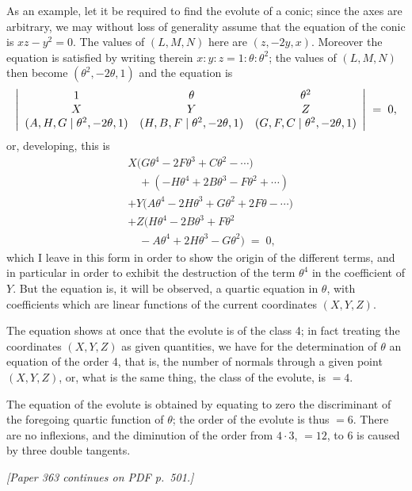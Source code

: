 \documentclass[11pt]{article}
\begin{document}
As an example, let it be required to find the evolute of a conic; since the axes are arbitrary, we may without loss of generality assume that the equation of the conic is $xz - y^{2} = 0$. The values of $(L, M, N)$ here are $(z, -2y, x)$. Moreover the equation is satisfied by writing therein $x : y : z = 1 : \theta : \theta^{2}$; the values of $(L, M, N)$ then become $(\theta^{2}, -2\theta, 1)$ and the equation is
\[
\resizebox{\textwidth}{!}{$\displaystyle
\left|\begin{array}{ccc}
1 & \theta & \theta^{2}\\
X & Y & Z\\
(A, H, G \mid \theta^{2}, -2\theta, 1) & (H, B, F \mid \theta^{2}, -2\theta, 1) & (G, F, C \mid \theta^{2}, -2\theta, 1)
\end{array}\right| \;=\; 0,
$}
\]
or, developing, this is
\begin{align*}
& X\bigl(G\theta^{4} - 2 F\theta^{3} + C\theta^{2} - \cdots\bigr)\\
& \quad + (-H\theta^{4} + 2 B\theta^{3} - F\theta^{2} + \cdots)\\
& + Y\bigl(A\theta^{4} - 2 H\theta^{3} + G\theta^{2} + 2 F\theta - \cdots\bigr)\\
& + Z\bigl(H\theta^{4} - 2 B\theta^{3} + F\theta^{2}\\
& \quad - A\theta^{4} + 2 H\theta^{3} - G\theta^{2}\bigr) \;=\; 0,
\end{align*}
which I leave in this form in order to show the origin of the different terms, and in particular in order to exhibit the destruction of the term $\theta^{4}$ in the coefficient of $Y$. But the equation is, it will be observed, a quartic equation in $\theta$, with coefficients which are linear functions of the current coordinates $(X, Y, Z)$.

The equation shows at once that the evolute is of the class 4; in fact treating the coordinates $(X, Y, Z)$ as given quantities, we have for the determination of $\theta$ an equation of the order 4, that is, the number of normals through a given point $(X, Y, Z)$, or, what is the same thing, the class of the evolute, is $=4$.

The equation of the evolute is obtained by equating to zero the discriminant of the foregoing quartic function of $\theta$; the order of the evolute is thus $=6$. There are no inflexions, and the diminution of the order from $4\cdot 3$, $=12$, to 6 is caused by three double tangents.

\medskip
\noindent\textit{[Paper 363 continues on PDF p.~501.]}
\end{document}

